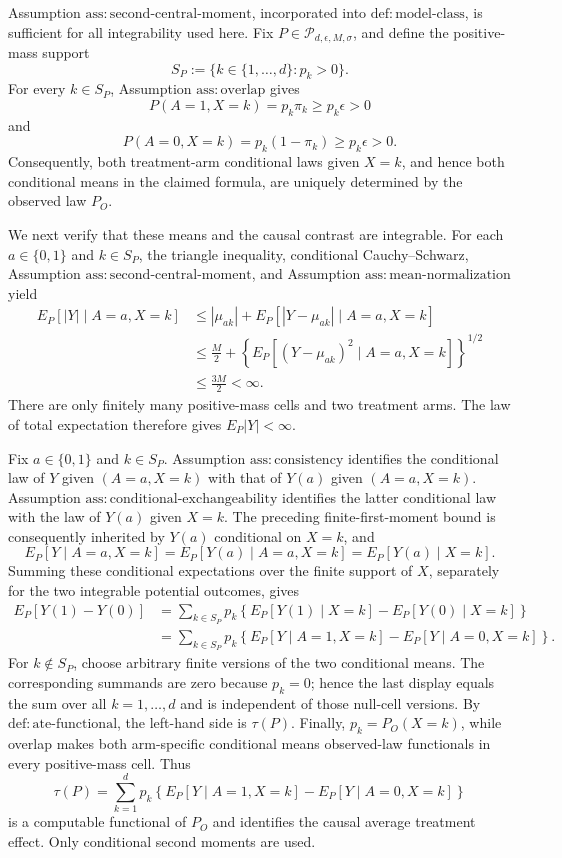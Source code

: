 Assumption \(\mathrm{ass:second\text{-}central\text{-}moment}\), incorporated into \(\mathrm{def:model\text{-}class}\), is sufficient for all integrability used here.  Fix \(P\in\mathcal P_{d,\epsilon,M,\sigma}\), and define the positive-mass support
\[
S_P:=\{k\in\{1,\ldots,d\}:p_k>0\}.
\]
For every \(k\in S_P\), Assumption \(\mathrm{ass:overlap}\) gives
\[
P(A=1,X=k)=p_k\pi_k\ge p_k\epsilon>0
\]
and
\[
P(A=0,X=k)=p_k(1-\pi_k)\ge p_k\epsilon>0.
\]
Consequently, both treatment-arm conditional laws given \(X=k\), and hence both conditional means in the claimed formula, are uniquely determined by the observed law \(P_O\).

We next verify that these means and the causal contrast are integrable.  For each \(a\in\{0,1\}\) and \(k\in S_P\), the triangle inequality, conditional Cauchy--Schwarz, Assumption \(\mathrm{ass:second\text{-}central\text{-}moment}\), and Assumption \(\mathrm{ass:mean\text{-}normalization}\) yield
\[
\begin{aligned}
E_P[|Y|\mid A=a,X=k]
&\le |\mu_{ak}|+E_P[|Y-\mu_{ak}|\mid A=a,X=k]\\
&\le \frac{M}{2}
+\left\{E_P[(Y-\mu_{ak})^2\mid A=a,X=k]\right\}^{1/2}\\
&\le \frac{3M}{2}<\infty.
\end{aligned}
\]
There are only finitely many positive-mass cells and two treatment arms.  The law of total expectation therefore gives \(E_P|Y|<\infty\).

Fix \(a\in\{0,1\}\) and \(k\in S_P\).  Assumption \(\mathrm{ass:consistency}\) identifies the conditional law of \(Y\) given \((A=a,X=k)\) with that of \(Y(a)\) given \((A=a,X=k)\).  Assumption \(\mathrm{ass:conditional\text{-}exchangeability}\) identifies the latter conditional law with the law of \(Y(a)\) given \(X=k\).  The preceding finite-first-moment bound is consequently inherited by \(Y(a)\) conditional on \(X=k\), and
\[
E_P[Y\mid A=a,X=k]
=E_P[Y(a)\mid A=a,X=k]
=E_P[Y(a)\mid X=k].
\]
Summing these conditional expectations over the finite support of \(X\), separately for the two integrable potential outcomes, gives
\[
\begin{aligned}
E_P[Y(1)-Y(0)]
&=\sum_{k\in S_P}p_k
\left\{E_P[Y(1)\mid X=k]-E_P[Y(0)\mid X=k]\right\}\\
&=\sum_{k\in S_P}p_k
\left\{E_P[Y\mid A=1,X=k]-E_P[Y\mid A=0,X=k]\right\}.
\end{aligned}
\]
For \(k\notin S_P\), choose arbitrary finite versions of the two conditional means.  The corresponding summands are zero because \(p_k=0\); hence the last display equals the sum over all \(k=1,\ldots,d\) and is independent of those null-cell versions.  By \(\mathrm{def:ate\text{-}functional}\), the left-hand side is \(\tau(P)\).  Finally, \(p_k=P_O(X=k)\), while overlap makes both arm-specific conditional means observed-law functionals in every positive-mass cell.  Thus
\[
\tau(P)=\sum_{k=1}^{d}p_k
\left\{E_P[Y\mid A=1,X=k]-E_P[Y\mid A=0,X=k]\right\}
\]
is a computable functional of \(P_O\) and identifies the causal average treatment effect.  Only conditional second moments are used.